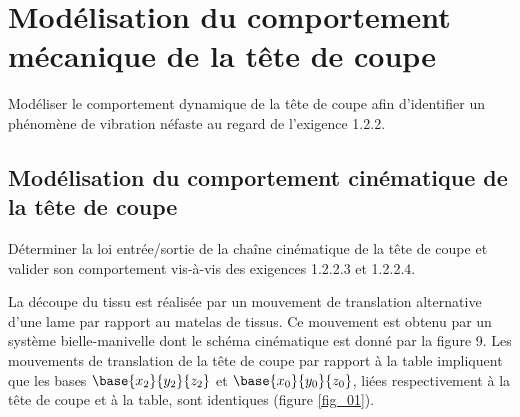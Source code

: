 \section{Modélisation du comportement mécanique de la tête de coupe}
\begin{obj}
Modéliser le comportement dynamique de la tête de coupe afin d’identifier un phénomène de vibration néfaste au regard de l’exigence 1.2.2.
\end{obj}

\subsection*{Modélisation du comportement cinématique de la tête de coupe}
\begin{obj}
Déterminer la loi entrée/sortie de la chaîne cinématique de la tête de coupe et valider son comportement vis-à-vis des exigences 1.2.2.3 et 1.2.2.4.
\end{obj}

La découpe du tissu est réalisée par un mouvement de translation alternative d’une lame par rapport au matelas de tissus. Ce mouvement est obtenu par un système bielle-manivelle dont le schéma cinématique est donné par la figure 9. Les mouvements de translation de la tête de coupe par rapport à la table impliquent que les bases $\base{x_2}{y_2}{z_2}$ et $\base{x_0}{y_0}{z_0}$, liées respectivement à la tête de coupe et à la table, sont identiques (figure \ref{fig_01}).


%
%
%
%
%
%

